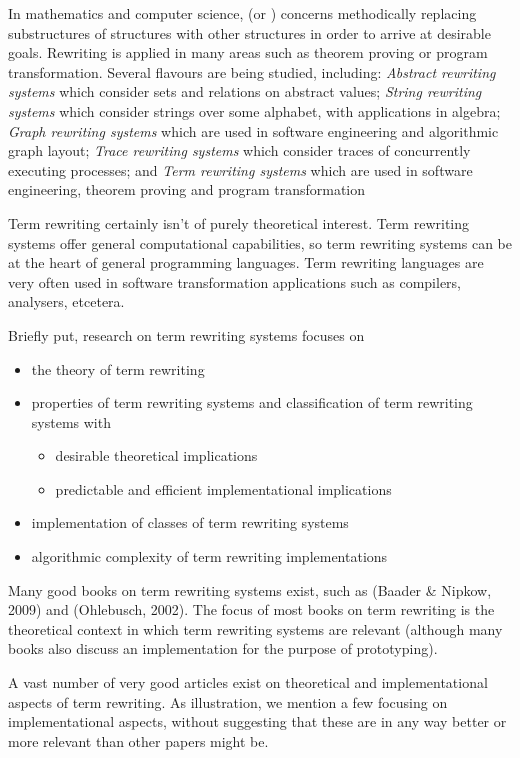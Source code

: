 \documentclass[11pt,twoside]{memoir}
\newcommand{\D}[1]{\index{#1}\defn{#1}}
\def\E{\emph} %
\begin{document}
In mathematics and computer science,  \D{rewriting} (or \D{reduction}) concerns methodically replacing substructures of structures with other structures in order to arrive at desirable goals. Rewriting is applied in many areas such as theorem proving or program transformation. Several flavours are being studied, including: 
\E{Abstract rewriting systems} which consider sets and relations on abstract values; 
\E{String rewriting systems} which consider strings over some alphabet, with applications in algebra; 
\E{Graph rewriting systems} which are used in software engineering and algorithmic graph layout; 
\E{Trace rewriting systems} which consider traces of concurrently executing processes; 
and \E{Term rewriting systems} which are used in software engineering, theorem proving and program transformation

Term rewriting certainly isn't of purely theoretical interest. Term rewriting systems offer general computational capabilities, so term rewriting systems can be at the heart of general programming languages. Term rewriting languages are very often used in software transformation applications such as compilers, analysers, etcetera.

Briefly put, research on term rewriting systems focuses on

\begin{itemize}
\item the theory of term rewriting
\item properties of term rewriting systems and classification of term rewriting systems with 
\begin{itemize}
\item desirable theoretical implications
\item predictable and efficient implementational implications 
\end{itemize}
\item implementation of classes of term rewriting systems
\item algorithmic complexity of term rewriting implementations
\end{itemize}

Many good books on term rewriting systems exist, such as (Baader \& Nipkow, 2009) and (Ohlebusch, 2002). The focus of most books on term rewriting is the theoretical context in which term rewriting systems are relevant (although many books also discuss an implementation for the purpose of prototyping). 

A vast number of very good articles exist on theoretical and implementational aspects of term rewriting. As illustration, we mention a few focusing on implementational aspects, without suggesting that these are in any way better or more relevant than other papers might be.
\end{document}
